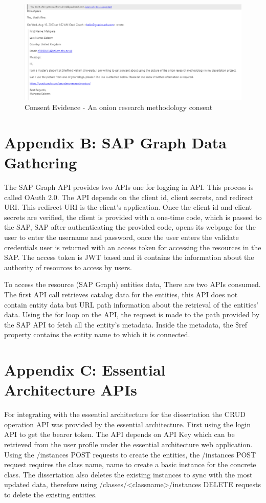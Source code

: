 \documentclass{article}
\begin{document}
\begin{figure}[ht!]
    \centering
    \includegraphics[scale=0.3]{onion-ring-consent}
    \caption{Consent Evidence  - 
An onion research methodology consent }
    \label{fig:onion-research-consent}
\end{figure}

\section{Appendix B: SAP Graph Data Gathering}
The SAP Graph API provides two APIs one for logging in API. This process is called OAuth 2.0. The API depends on the client id, client secrets, and redirect URI. This redirect URI is the client's application. Once the client id and client secrets are verified, the client is provided with a one-time code, which is passed to the SAP, SAP after authenticating the provided code, opens its webpage for the user to enter the username and password, once the user enters the validate credentials user is returned with an access token for accessing the resources in the SAP. The access token is JWT based and it contains the information about the authority of resources to access by users. 

To access the resource (SAP Graph) entities data, There are two APIs consumed. The first API call retrieves catalog data for the entities, this API does not contain entity data but URL path information about the retrieval of the entities' data. Using the for loop on the API, the request is made to the path provided by the SAP API to fetch all the entity's metadata. Inside the metadata, the \$ref property contains the entity name to which it is connected. 

\section{Appendix C: Essential Architecture APIs}
For integrating with the essential architecture for the dissertation the CRUD operation API was provided by the essential architecture. First using the login API to get the bearer token. The API depends on API Key which can be retrieved from the user profile under the essential architecture web application. Using the /instances POST requests to create the entities, the /instances POST request requires the class name, name to create a basic instance for the concrete class. The dissertation also deletes the existing instances to sync with the most updated data, therefore using /classes/<classname>/instances DELETE requests to delete the existing entities.
\end{document}
